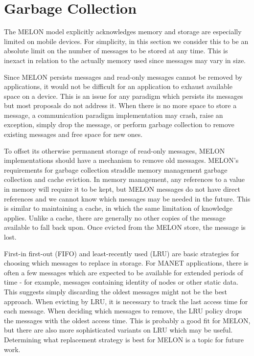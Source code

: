 \section{Garbage Collection}

The MELON model explicitly acknowledges memory and storage are especially limited on mobile devices. For simplicity, in this section we consider this to be an absolute limit on the number of messages to be stored at any time. This is inexact in relation to the actually memory used since messages may vary in size.

Since MELON persists messages and read-only messages cannot be removed by applications, it would not be difficult for an application to exhaust available space on a device. This is an issue for any paradigm which persists its messages but most proposals do not address it. When there is no more space to store a message, a communication paradigm implementation may crash, raise an exception, simply drop the message, or perform garbage collection to remove existing messages and free space for new ones.

To offset its otherwise permanent storage of read-only messages, MELON implementations should have a mechanism to remove old messages. MELON's requirements for garbage collection straddle memory management garbage collection and cache eviction. In memory management, any references to a value in memory will require it to be kept, but MELON messages do not have direct references and we cannot know which messages may be needed in the future. This is similar to maintaining a cache, in which the same limitation of knowledge applies. Unlike a cache, there are generally no other copies of the message available to fall back upon. Once evicted from the MELON store, the message is lost.

First-in first-out (FIFO) and least-recently used (LRU) are basic strategies for choosing which messages to replace in storage. For MANET applications, there is often a few messages which are expected to be available for extended periods of time - for example, messages containing identity of nodes or other static data. This suggests simply discarding the oldest messages might not be the best approach. When evicting by LRU, it is necessary to track the last access time for each message. When deciding which messages to remove, the LRU policy drops the messages with the oldest access time. This is probably a good fit for MELON, but there are also more sophisticated variants on LRU which may be useful. Determining what replacement strategy is best for MELON is a topic for future work.

